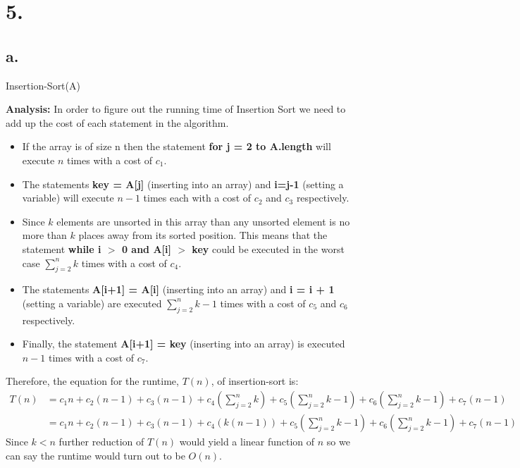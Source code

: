 \documentclass[12pt]{article}
\begin{document}
\section*{5.}
\subsection*{a.}
\begin{algorithm}
\BlankLine
{}
\caption{Insertion-Sort(A)}
\end{algorithm}
\textbf{Analysis: }In order to figure out the running time of Insertion Sort we need to add up the cost of each statement in the algorithm.\\
\begin{itemize}
\item If the array is of size n then the statement \textbf{for j = 2 to A.length} will execute $n$ times with a cost of $c_1$.\\
\item The statements \textbf{key = A[j]} (inserting into an array) and \textbf{i=j-1} (setting a variable) will execute $n-1$ times each with a cost of $c_2$ and $c_3$ respectively.\\
\item Since $k$ elements are unsorted in this array than any unsorted element is no more than $k$ places away from its sorted position.  This means that the statement \textbf{while i $>$ 0 and A[i] $>$ key} could be executed in the worst case $\sum_{j=2}^{n} k$ times with a cost of $c_4$.\\
\item The statements \textbf{A[i+1] = A[i]} (inserting into an array) and \textbf{i = i + 1} (setting a variable) are executed $\sum_{j=2}^{n} k - 1$ times with a cost of $c_5$ and $c_6$ respectively.\\
\item Finally, the statement \textbf{A[i+1] = key} (inserting into an array) is executed $n-1$ times with a cost of $c_7$.\\
\end{itemize}
Therefore, the equation for the runtime, $T(n)$, of insertion-sort is:\\
\begin{align*}
T(n)  & = c_1n + c_2(n-1) + c_3(n-1) + c_4(\sum_{j=2}^{n} k) + c_5(\sum_{j=2}^{n} k - 1) + c_6(\sum_{j=2}^{n} k - 1) + c_7(n-1)\\
	& = c_1n + c_2(n-1) + c_3(n-1) + c_4(k(n-1)) + c_5(\sum_{j=2}^{n} k - 1) + c_6(\sum_{j=2}^{n} k - 1) + c_7(n-1)
\end{align*}
Since $k < n$ further reduction of $T(n)$ would yield a linear function of $n$ so we can say the runtime would turn out to be $O(n)$.
\end{document}
